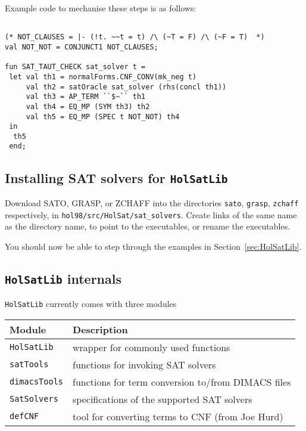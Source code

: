 Example \HOL{} code to mechanise these steps is as follows:

\begin{session}\begin{verbatim}

(* NOT_CLAUSES = |- (!t. ~~t = t) /\ (~T = F) /\ (~F = T)  *)
val NOT_NOT = CONJUNCT1 NOT_CLAUSES;

fun SAT_TAUT_CHECK sat_solver t =
 let val th1 = normalForms.CNF_CONV(mk_neg t)
     val th2 = satOracle sat_solver (rhs(concl th1))
     val th3 = AP_TERM ``$~`` th1
     val th4 = EQ_MP (SYM th3) th2
     val th5 = EQ_MP (SPEC t NOT_NOT) th4
 in
  th5
 end;

\end{verbatim}\end{session}
\subsection{Installing SAT solvers for {\tt HolSatLib}}\label{install}

Download SATO, GRASP, or ZCHAFF into the directories {\tt sato}, {\tt grasp},
{\tt zchaff}  respectively, in {\tt hol98/src/HolSat/sat\_solvers}. Create links of the same name as the directory name, to point to the executables, or rename the executables.

You should now be able to step through the examples in Section~\ref{sec:HolSatLib}.

\subsection{{\tt HolSatLib} internals}

{\tt HolSatLib} currently comes with three modules

\medskip

\begin{tabular}{ll}
{\bf Module} & {\bf Description} \\ \hline
{\tt HolSatLib} & wrapper for commonly used functions\\
{\tt satTools} & functions for invoking SAT solvers\\
{\tt dimacsTools} & functions for term conversion to/from DIMACS files\\
{\tt SatSolvers} & specifications of the supported SAT solvers\\
{\tt defCNF} & tool for converting \HOL{} terms to CNF (from Joe Hurd)
\end{tabular}

